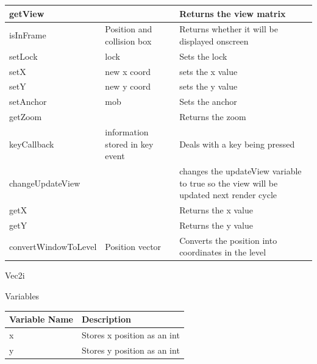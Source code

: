 \documentclass{article}
\begin{document}
\begin{center}
\begin{tabular}{ | m{} | m{}| m{} | }
                        getView & & Returns the view matrix \\
                        \hline
                        isInFrame & Position and collision box & Returns whether it will be displayed onscreen \\
                        \hline
                        setLock & lock & Sets the lock \\
                        \hline
                        setX & new x coord & sets the x value \\
                        \hline
                        setY & new y coord & sets the y value \\
                        \hline
                        setAnchor & mob & Sets the anchor  \\
                        \hline
                        getZoom & & Returns the zoom \\
                        \hline
                        keyCallback & information stored in key event & Deals with a key being pressed \\
                        \hline
                        changeUpdateView & & changes the updateView variable to true so the view will be updated next render cycle \\
                        \hline
                        getX & & Returns the x value \\
                        \hline
                        getY & & Returns the y value \\
                        \hline
                        convertWindowToLevel & Position vector & Converts the position into coordinates in the level \\
                        \hline
                    \end{tabular}
                \end{center}
                Vec2i
                \begin{center}
                    Variables
                    \begin{tabular}{ | m{} | m{} | }
                        \hline
                        \textbf{Variable Name} & \textbf{Description} \\
                        \hline
                        x & Stores x position as an int \\
                        \hline
                        y & Stores y position as an int \\
                        \hline
                    \end{tabular}
                \end{center}
\end{document}
